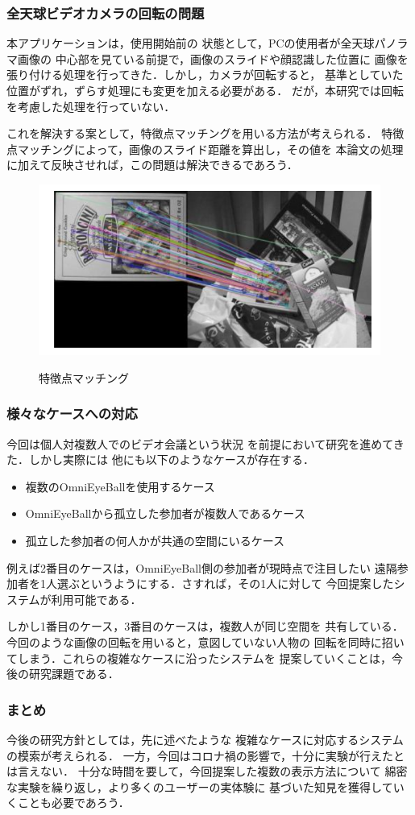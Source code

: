 \subsubsection*{全天球ビデオカメラの回転の問題}

本アプリケーションは，使用開始前の
状態として，PCの使用者が全天球パノラマ画像の
中心部を見ている前提で，画像のスライドや顔認識した位置に
画像を張り付ける処理を行ってきた．しかし，カメラが回転すると，
基準としていた位置がずれ，ずらす処理にも変更を加える必要がある．
だが，本研究では回転を考慮した処理を行っていない．

これを解決する案として，特徴点マッチングを用いる方法が考えられる．
特徴点マッチングによって，画像のスライド距離を算出し，その値を
本論文の処理に加えて反映させれば，この問題は解決できるであろう．

\begin{figure}[tp]
  \centering
  \includegraphics[scale=0.7]{fig/matching.png}
  \caption{特徴点マッチング} \cite{17}
\end{figure}

\subsubsection*{様々なケースへの対応}
今回は個人対複数人でのビデオ会議という状況
を前提において研究を進めてきた．しかし実際には
他にも以下のようなケースが存在する．
\begin{itemize}
  \item 複数のOmniEyeBallを使用するケース
  \item OmniEyeBallから孤立した参加者が複数人であるケース
  \item 孤立した参加者の何人かが共通の空間にいるケース
\end{itemize}

例えば2番目のケースは，OmniEyeBall側の参加者が現時点で注目したい
遠隔参加者を1人選ぶというようにする．さすれば，その1人に対して
今回提案したシステムが利用可能である．

しかし1番目のケース，3番目のケースは，複数人が同じ空間を
共有している．今回のような画像の回転を用いると，意図していない人物の
回転を同時に招いてしまう．これらの複雑なケースに沿ったシステムを
提案していくことは，今後の研究課題である．

\subsubsection*{まとめ}
今後の研究方針としては，先に述べたような
複雑なケースに対応するシステムの模索が考えられる．
一方，今回はコロナ禍の影響で，十分に実験が行えたとは言えない．
十分な時間を要して，今回提案した複数の表示方法について
綿密な実験を繰り返し，より多くのユーザーの実体験に
基づいた知見を獲得していくことも必要であろう．
